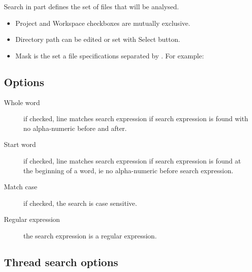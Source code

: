 Search in part defines the set of files that will be analysed.

\begin{itemize}
\item Project and Workspace checkboxes are mutually exclusive.
\item Directory path can be edited or set with Select button.
\item Mask is the set a file specifications separated by \samp{;}. For example: 
\end{itemize}

\subsection{Options}

\begin{description}
\item[Whole word] if checked, line matches search expression if search expression is found with no alpha-numeric  before and after.
\item[Start word] if checked, line matches search expression if search expression is found at the beginning of a word, ie no alpha-numeric  before search expression.
\item[Match case] if checked, the search is case sensitive.
\item[Regular expression] the search expression is a regular expression.
\end{description}


\subsection{Thread search options}

